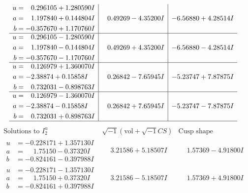 \documentclass[1p]{elsarticle_modified}
\theoremstyle{definition}
\newcommand{\I}{\sqrt{-1}}
\begin{document}
$$\begin{array}{c|c|c}
\begin{aligned}
u &= \phantom{-}0.296105 + 1.280590 I \\
a &= \phantom{-}1.197840 + 0.144804 I \\
b &= -0.357670 + 1.170760 I\end{aligned}
 & \phantom{-}0.49269 - 4.35200 I & -6.56880 + 4.28514 I \\ \hline\begin{aligned}
u &= \phantom{-}0.296105 - 1.280590 I \\
a &= \phantom{-}1.197840 - 0.144804 I \\
b &= -0.357670 - 1.170760 I\end{aligned}
 & \phantom{-}0.49269 + 4.35200 I & -6.56880 - 4.28514 I \\ \hline\begin{aligned}
u &= \phantom{-}0.126979 + 1.360070 I \\
a &= -2.38874 + 0.15858 I \\
b &= \phantom{-}0.732031 - 0.898763 I\end{aligned}
 & \phantom{-}0.26842 - 7.65945 I & -5.23747 + 7.87875 I \\ \hline\begin{aligned}
u &= \phantom{-}0.126979 - 1.360070 I \\
a &= -2.38874 - 0.15858 I \\
b &= \phantom{-}0.732031 + 0.898763 I\end{aligned}
 & \phantom{-}0.26842 + 7.65945 I & -5.23747 - 7.87875 I\\
 \hline 
 \end{array}$$\newpage$$\begin{array}{c|c|c}  
\text{Solutions to }I^u_{2}& \I (\text{vol} + \sqrt{-1}CS) & \text{Cusp shape}\\
 \hline 
\begin{aligned}
u &= -0.228171 + 1.357130 I \\
a &= \phantom{-}1.75150 - 0.37320 I \\
b &= -0.824161 - 0.397988 I\end{aligned}
 & \phantom{-}3.21586 + 5.18507 I & \phantom{-}1.57369 - 4.91800 I \\ \hline\begin{aligned}
u &= -0.228171 - 1.357130 I \\
a &= \phantom{-}1.75150 + 0.37320 I \\
b &= -0.824161 + 0.397988 I\end{aligned}
 & \phantom{-}3.21586 - 5.18507 I & \phantom{-}1.57369 + 4.91800 I \\ \hline\begin{aligned}

\end{aligned}
\end{array}$$
\end{document}
